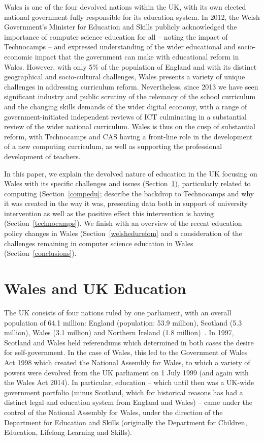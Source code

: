 \documentclass{sig-alternate}
\begin{document}
Wales is one of the four devolved nations within the UK, with its own
elected national government fully responsible for its education
system.  In 2012, the Welsh Government's Minister for Education and
Skills publicly acknowledged the importance of computer science
education for all -- noting the impact of Technocamps -- and expressed
understanding of the wider educational and socio-economic impact that
the government can make with educational reform in Wales.  However,
with only 5\% of the population of England and with its distinct
geographical and socio-cultural challenges, Wales presents a variety
of unique challenges in addressing curriculum reform. Nevertheless,
since 2013 we have seen significant industry and public scrutiny of
the relevancy of the school curriculum and the changing skills demands
of the wider digital economy, with a range of government-initiated
independent reviews of ICT culminating in a substantial review of the
wider national curriculum. Wales is thus on the cusp of substantial
reform, with Technocamps and CAS having a front-line role in the
development of a new computing curriculum, as well as supporting the
professional development of teachers.

In this paper, we explain the devolved nature of education in the UK
focusing on Wales with its specific challenges and issues
(Section~\ref{welshukedu}), particularly related to computing
(Section~\ref{compedu}; describe the backdrop to Technocamps and why
it was created in the way it was, presenting data both in support of
university intervention as well as the positive effect this
intervention is having (Section~\ref{technocamps}).  We finish with an
overview of the recent education policy changes in Wales
(Section~\ref{welshedurefom} and a consideration of the challenges
remaining in computer science education in Wales
(Section~\ref{conclusions}).

\section{Wales and UK Education}\label{welshukedu}

The UK consists of four nations ruled by one parliament, with an
overall population of 64.1 million: England (population: 53.9
million), Scotland (5.3 million), Wales (3.1 million) and Northern
Ireland (1.8 million)~\cite{onspop:2014}. In 1997, Scotland and Wales
held referendums which determined in both cases the desire for
self-government.  In the case of Wales, this led to the Government of
Wales Act 1998 which created the National Assembly for Wales, to which
a variety of powers were devolved from the UK parliament on 1 July
1999 (and again with the Wales Act 2014).  In particular, education --
which until then was a UK-wide government portfolio (minus Scotland,
which for historical reasons has had a distinct legal and education
system from England and Wales) -- came under the control of the
National Assembly for Wales, under the direction of the Department for
Education and Skills (originally the Department for Children,
Education, Lifelong Learning and Skills).
\end{document}
